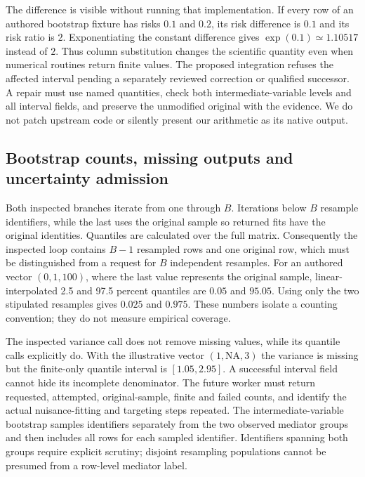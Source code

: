 The difference is visible without running that implementation. If every row of
an authored bootstrap fixture has risks $0.1$ and $0.2$, its risk difference is
$0.1$ and its risk ratio is $2$. Exponentiating the constant difference gives
$\exp(0.1)\simeq1.10517$ instead of $2$. Thus column substitution changes the
scientific quantity even when numerical routines return finite values. The
proposed integration refuses the affected interval pending a separately
reviewed correction or qualified successor. A repair must use named quantities,
check both intermediate-variable levels and all interval fields, and preserve
the unmodified original with the evidence. We do not patch upstream code or
silently present our arithmetic as its native output.
\citep{exec24_tmle_contract}

\subsection{Bootstrap counts, missing outputs and uncertainty admission}
Both inspected branches iterate from one through $B$. Iterations below $B$
resample identifiers, while the last uses the original sample so returned fits
have the original identities. Quantiles are calculated over the full matrix.
Consequently the inspected loop contains $B-1$ resampled rows and one original
row, which must be distinguished from a request for $B$ independent resamples.
For an authored vector $(0,1,100)$, where the last value represents the original
sample, linear-interpolated 2.5 and 97.5 percent quantiles are $0.05$ and $95.05$.
Using only the two stipulated resamples gives $0.025$ and $0.975$. These numbers
isolate a counting convention; they do not measure empirical coverage.
\citep{exec24_tmle_sources,exec24_tmle_contract}

The inspected variance call does not remove missing values, while its quantile
calls explicitly do. With the illustrative vector $(1,\mathrm{NA},3)$ the
variance is missing but the finite-only quantile interval is $[1.05,2.95]$.
A successful interval field cannot hide its incomplete denominator. The future
worker must return requested, attempted, original-sample, finite and failed
counts, and identify the actual nuisance-fitting and targeting steps repeated.
The intermediate-variable bootstrap samples identifiers separately from the two
observed mediator groups and then includes all rows for each sampled identifier.
Identifiers spanning both groups require explicit scrutiny; disjoint resampling
populations cannot be presumed from a row-level mediator label.
\citep{exec24_tmle_sources,exec24_tmle_contract}

